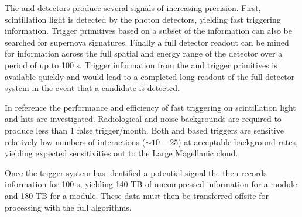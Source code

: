 \documentclass[../main-v1.tex]{subfiles}
\begin{document}



The  and  detectors produce several signals of increasing precision.  First, scintillation light is detected by the photon detectors, yielding fast triggering information.  Trigger primitives based on a subset of the  information can also be searched for supernova signatures.  Finally a full detector readout can be mined for information across the full spatial and energy range of the detector over a period of up to 100 s.  Trigger information from the  and trigger primitives is available quickly and would lead to a completed long readout of the full detector system in the event that a candidate  is detected. 

In reference \cite{DUNE:2020zfm} the performance and efficiency of fast triggering on scintillation light and  hits are investigated.  Radiological and noise backgrounds are required to produce less than 1 false trigger/month. Both  and  based triggers are sensitive relatively low numbers of interactions ($\sim10-25$) at acceptable background rates, yielding expected sensitivities out to the Large Magellanic cloud.

Once the trigger system has identified a potential  signal  the  then records information for 100 s, yielding 140 TB of uncompressed information for a  module and 180 TB for a  module.  These data must then be transferred offsite for processing with the full algorithms. 
\end{document}
